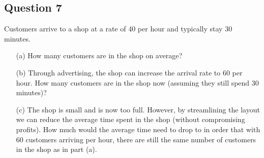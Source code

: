 \subsection*{Question 7}
Customers arrive to a shop at a rate of 40 per hour and typically stay 30 minutes. \\[-0.2cm]
\begin{itemize}
\item[(a)] How many customers are in the shop on average?  \item[(b)] Through advertising, the shop can increase the arrival rate to 60 per hour. How many customers are in the shop now (assuming they still spend 30 minutes)?  \item[(c)] The shop is small and is now too full. However, by streamlining the layout we can reduce the average time spent in the shop (without compromising profits). How much would the average time need to drop to in order that with 60 customers arriving per hour, there are still the same number of customers in the shop as in part (a).


\end{itemize}







 
